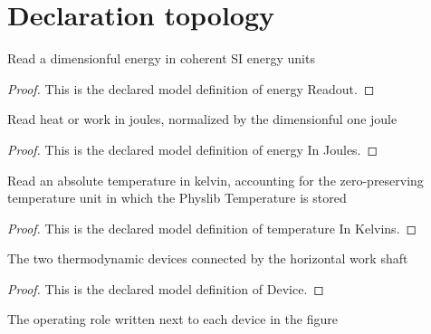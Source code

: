 \section{Declaration topology}
\begin{definition}
  \label{def:physics:phyx-mini-0424:phyxminiproblems-problemphyxmini0424-energyreadout}
  Read a dimensionful energy in coherent SI energy units
\end{definition}
\begin{proof}
  This is the declared model definition of energy Readout.
\end{proof}
\begin{definition}
  \label{def:physics:phyx-mini-0424:phyxminiproblems-problemphyxmini0424-energyinjoules}
  Read heat or work in joules, normalized by the dimensionful one joule
\end{definition}
\begin{proof}
  This is the declared model definition of energy In Joules.
\end{proof}
\begin{definition}
  \label{def:physics:phyx-mini-0424:phyxminiproblems-problemphyxmini0424-temperatureinkelvins}
  Read an absolute temperature in kelvin, accounting for the zero-preserving temperature unit in which the Physlib Temperature is stored
\end{definition}
\begin{proof}
  This is the declared model definition of temperature In Kelvins.
\end{proof}
\begin{definition}[Device]
  \label{def:physics:phyx-mini-0424:phyxminiproblems-problemphyxmini0424-device}
  The two thermodynamic devices connected by the horizontal work shaft
\end{definition}
\begin{proof}
  This is the declared model definition of Device.
\end{proof}
\begin{definition}
  \label{def:physics:phyx-mini-0424:phyxminiproblems-problemphyxmini0424-devicemode}
  The operating role written next to each device in the figure
\end{definition}
